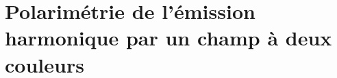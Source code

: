 \part{Polarimétrie de l'émission harmonique par un champ à deux couleurs}
\label{part:Polarimétrie}
